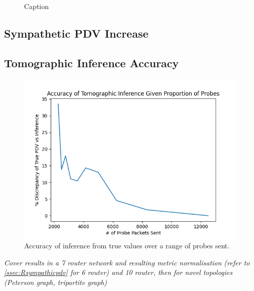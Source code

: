 \begin{figure}[H]
    \centering
    \caption{Caption}
    \label{fig:Rrandgraphpdv}
\end{figure}


\subsection*{Sympathetic PDV Increase}
\label{ssec:Rsympathicpdv}

\subsection*{Tomographic Inference Accuracy}
\begin{figure}[H]
        \centering
        \includegraphics[width=\textwidth]{figs/results/Probe_PDV_accuracy_plot.png}
        \caption{Accuracy of inference from true values over a range of probes sent.}
        \label{fig:Rqstabilization}
\end{figure}
\emph{Cover results in a 7 router network and resulting metric normalisation (refer to \cref{ssec:Rsympathicpdv} for 6 router) and 10 router, then for novel topologies (Peterson graph, tripartite graph)}


